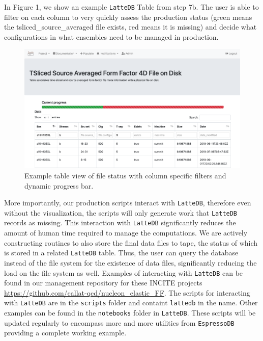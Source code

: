 In Figure 1, we show an example \texttt{LatteDB} Table from step 7b. The
user is able to filter on each column to very quickly assess the
production status (green means the tsliced\_source\_averaged file
exists, red means it is missing) and decide what configurations in what
ensembles need to be managed in production.

\begin{figure}[t!]
\centering
\includegraphics{lattedb-example.png}
\caption{Example table view of file status with column specific filters
and dynamic progress bar.}
\end{figure}

More importantly, our production scripts interact with \texttt{LatteDB},
therefore even without the visualization, the scripts will only generate
work that \texttt{LatteDB} records as missing. This interaction with
\texttt{LatteDB} significantly reduces the amount of human time required
to manage the computations. We are actively constructing routines to
also store the final data files to tape, the status of which is stored
in a related \texttt{LatteDB} table. Thus, the user can query the
database instead of the file system for the existence of data files,
significantly reducing the load on the file system as well.
Examples of interacting with \texttt{LatteDB} can be found in
our management repository for these INCITE projects
\url{https://github.com/callat-qcd/nucleon_elastic_FF}.
The scripts for interacting with \texttt{LatteDB} are in the \texttt{scripts} folder and containt \texttt{lattedb} in the name.
Other examples can be found in the \texttt{notebooks} folder in
\texttt{LatteDB}. These scripts will be updated regularly to encompass
more and more utilities from \texttt{EspressoDB} providing a complete
working example.

